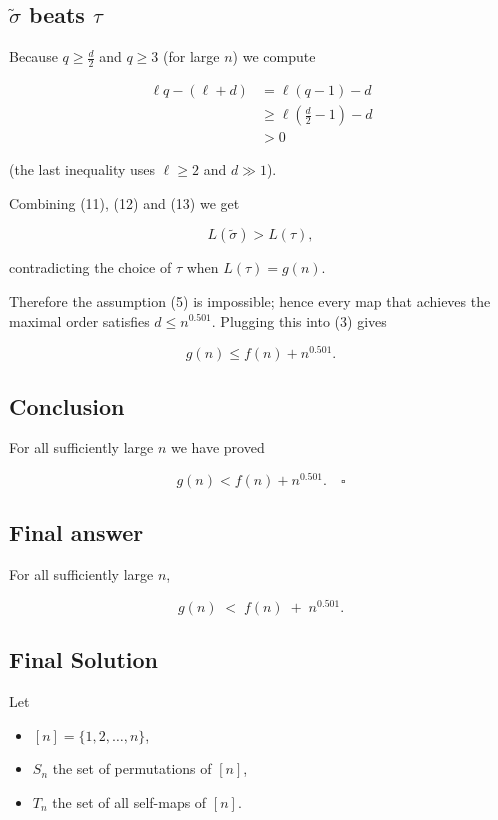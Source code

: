 \documentclass[12pt,a4paper]{article}
\theoremstyle{definition}
\begin{document}
    \subsection*{$\tilde{\sigma}$ beats $\tau$}

    Because $q \geq \frac{d}{2}$ and $q \geq 3$ (for large $n$) we compute

    \begin{align}
        \ell q - (\ell + d) &= \ell(q - 1) - d \\
        &\geq \ell\left(\frac{d}{2} - 1\right) - d \\
        &> 0
    \end{align}

    (the last inequality uses $\ell \geq 2$ and $d \gg 1$).

    Combining (11), (12) and (13) we get

    $$L(\tilde{\sigma}) > L(\tau),$$

    contradicting the choice of $\tau$ when $L(\tau) = g(n)$.

    Therefore the assumption (5) is impossible; hence every map that
    achieves the maximal order satisfies $d \leq n^{0.501}$. Plugging this
    into (3) gives

    \begin{equation}
        g(n) \leq f(n) + n^{0.501}.
    \end{equation}

    \subsection*{Conclusion}

    For all sufficiently large $n$ we have proved

    $$g(n) < f(n) + n^{0.501}. \quad \square$$

    \subsection*{Final answer}

    For all sufficiently large $n$,

    $$g(n) \;<\; f(n)\;+\; n^{0.501}.$$

\subsection{Final Solution}
        Let
        \begin{itemize}
            \item $[n] = \{1, 2, \ldots, n\}$,
            \item $S_n$ the set of permutations of $[n]$,
            \item $T_n$ the set of all self-maps of $[n]$.
        \end{itemize}
\end{document}
